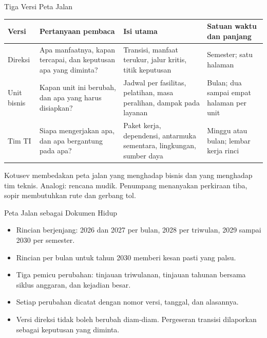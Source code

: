 \documentclass[aspectratio=169, table, 12pt]{beamer}
\begin{document}
\begin{frame}{{\Large Tiga Versi Peta Jalan}}
  \scriptsize
  \begin{tabularx}{\textwidth}{L{1.5cm}YYL{2.5cm}}
    \hline
    \textbf{Versi} & \textbf{Pertanyaan pembaca} & \textbf{Isi utama} &
      \textbf{Satuan waktu dan panjang} \\
    \hline
    Direksi & Apa manfaatnya, kapan tercapai, dan keputusan apa yang diminta? &
      Transisi, manfaat terukur, jalur kritis, titik keputusan & Semester;
      satu halaman \\
    \hline
    Unit bisnis & Kapan unit ini berubah, dan apa yang harus disiapkan? &
      Jadwal per fasilitas, pelatihan, masa peralihan, dampak pada layanan &
      Bulan; dua sampai empat halaman per unit \\
    \hline
    Tim TI & Siapa mengerjakan apa, dan apa bergantung pada apa? & Paket kerja,
      dependensi, antarmuka sementara, lingkungan, sumber daya & Minggu atau
      bulan; lembar kerja rinci \\
    \hline
  \end{tabularx}

  \vspace{6pt}
  \small Kotusev membedakan peta jalan yang menghadap bisnis dan yang menghadap tim teknis. Analogi:
  rencana mudik. Penumpang menanyakan perkiraan tiba, sopir membutuhkan rute dan gerbang tol.
\end{frame}

\begin{frame}{{\Large Peta Jalan sebagai Dokumen Hidup}}
  \small
  \vspace{4pt}
  \begin{itemize}
    \item Rincian berjenjang: 2026 dan 2027 per bulan, 2028 per triwulan, 2029 sampai 2030 per semester.
    \item Rincian per bulan untuk tahun 2030 memberi kesan pasti yang palsu.
    \item Tiga pemicu perubahan: tinjauan triwulanan, tinjauan tahunan bersama siklus anggaran, dan
          kejadian besar.
    \item Setiap perubahan dicatat dengan nomor versi, tanggal, dan alasannya.
    \item Versi direksi tidak boleh berubah diam-diam. Pergeseran transisi dilaporkan sebagai keputusan
          yang diminta.
  \end{itemize}
\end{frame}
\end{document}
